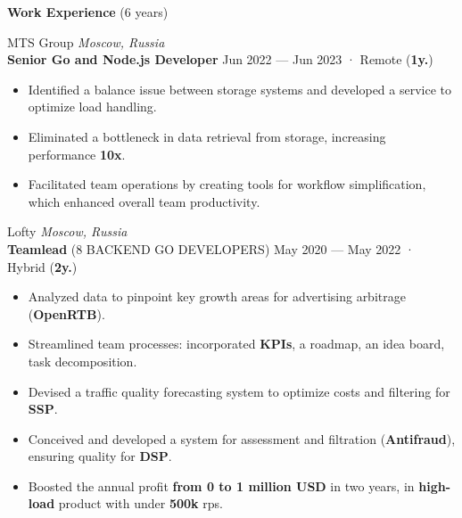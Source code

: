 \documentclass{resume}
\begin{document}
\begin{rSection}{\textbf{Work Experience} (6 years) }

MTS Group \hfill \textit{Moscow, Russia} \\
\textbf{Senior Go and Node.js Developer}  \hfill Jun 2022 --- Jun 2023 · Remote ({\textbf{1y.}})
\begin{itemize}
    \setlength\itemsep{-0.4em}
    \item Identified a balance issue between storage systems and developed a service to optimize load handling\@.
    \item Eliminated a bottleneck in data retrieval from storage, increasing performance \textbf{10x}\@.
    \item Facilitated team operations by creating tools for workflow simplification, which enhanced overall team productivity\@.
\end{itemize}

Lofty \hfill \textit{Moscow, Russia} \\
\textbf{Teamlead} (8 BACKEND GO DEVELOPERS) \hfill May 2020 --- May 2022 · Hybrid ({\textbf{2y.}})
\begin{itemize}
    \item Analyzed data to pinpoint key growth areas for advertising arbitrage (\textbf{OpenRTB})\@.
    \item Streamlined team processes: incorporated \textbf{KPIs}, a roadmap, an idea board, task decomposition\@.
    \item Devised a traffic quality forecasting system to optimize costs and filtering for \textbf{SSP}\@.
    \item Conceived and developed a system for assessment and filtration (\textbf{Antifraud}), ensuring quality for \textbf{DSP}\@.
    \item Boosted the annual profit \textbf{from 0 to 1 million USD} in two years, in \textbf{high-load} product with under \textbf{500k} rps\@.
\end{itemize}


\end{rSection}
\end{document}
